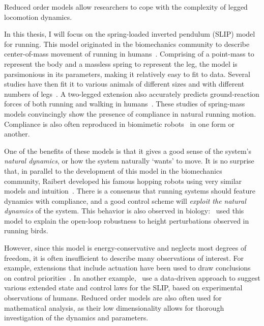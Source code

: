Reduced order models allow researchers to cope with the complexity of legged locomotion dynamics. \par
In this thesis, I will focus on the spring-loaded inverted pendulum (SLIP) model for running. This model originated in the biomechanics community to describe center-of-mass movement of running in humans~\cite{blickhan1989spring}. Comprising of a point-mass to represent the body and a massless spring to represent the leg, the model is parsimonious in its parameters, making it relatively easy to fit to data.
Several studies have then fit it to various animals of different sizes and with different numbers of legs~\cite{blickhan1993similarity,daley2006running,jindrich2002dynamic}. A two-legged extension also accurately predicts ground-reaction forces of both running and walking in humans~\cite{geyer2006compliant}. These studies of spring-mass models convincingly show the presence of compliance in natural running motion. Compliance is also often reproduced in biomimetic robots~\cite{sprowitz2013cheetah,buchli2006resonance,hubicki2016atrias,hutter2016anymal,kenneally2016design,ramos2018facilitating} in one form or another. \par
One of the benefits of these models is that it gives a good sense of the system's \emph{natural dynamics}, or how the system naturally `wants' to move.
It is no surprise that, in parallel to the development of this model in the biomechanics community, Raibert developed his famous hopping robots using very similar models and intuition~\cite[see Figure 2.5]{raibert1986legged}.
There is a consensus that running systems should feature dynamics with compliance, and a good control scheme will \emph{exploit the natural dynamics} of the system.
This behavior is also observed in biology:~\textcite{daley2006running} used this model to explain the open-loop robustness to height perturbations observed in running birds. \par
However, since this model is energy-conservative and neglects most degrees of freedom, it is often insufficient to describe many observations of interest. For example, extensions that include actuation have been used to draw conclusions on control priorities~\cite{Birn-Jeffery3786,blum2014swing}. In another example,~\textcite{maus2015constructing} use a data-driven approach to suggest various extended state and control laws for the SLIP, based on experimental observations of humans. %
Reduced order models are also often used for mathematical analysis, as their low dimensionality allows for thorough investigation of the dynamics and parameters.
